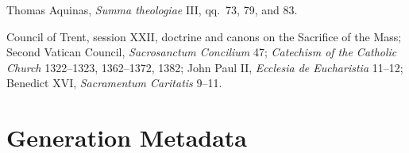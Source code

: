 \begin{deepstudy}
\begin{description}[style=nextline,leftmargin=0pt,labelsep=0pt]
\item[Scholastic source]
Thomas Aquinas, \emph{Summa theologiae} III, qq.~73, 79, and 83.

\item[Authoritative teaching]
Council of Trent, session XXII, doctrine and canons on the Sacrifice of the
Mass; Second Vatican Council, \emph{Sacrosanctum Concilium} 47; \emph{Catechism
of the Catholic Church} 1322--1323, 1362--1372, 1382; John Paul II,
\emph{Ecclesia de Eucharistia} 11--12; Benedict XVI, \emph{Sacramentum
Caritatis} 9--11.
\end{description}

\begingroup
\setlength{\parskip}{0pt}
\vspace{-0.4\baselineskip}
\section{Generation Metadata}
\vspace{-0.3\baselineskip}
{\scriptsize}
\endgroup

\end{deepstudy}


